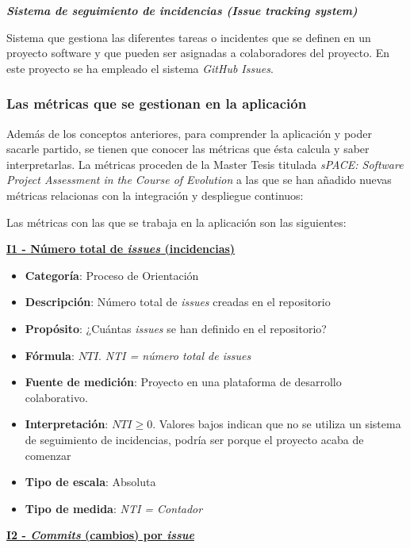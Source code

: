 \textbf{\textit{Sistema de seguimiento de incidencias (\textit{Issue tracking system})}}

Sistema que gestiona las diferentes tareas o incidentes que se definen en un proyecto software y que pueden ser asignadas a colaboradores del proyecto. En este proyecto se ha empleado el sistema \textit{GitHub Issues}.

\subsubsection{Las métricas que se gestionan en la aplicación}

Además de los conceptos anteriores, para comprender la aplicación y poder sacarle partido, se tienen que conocer las métricas que ésta calcula y saber interpretarlas. La métricas proceden de la Master Tesis titulada \textit{sPACE: Software Project Assessment in the Course of Evolution} \cite{ratzinger_space:_2007} a las que se han añadido nuevas métricas relacionas con la integración y despliegue continuos:


Las métricas con las que se trabaja en la aplicación son las siguientes:

\textbf{\underline{I1 - Número total de \textit{issues} (incidencias)}}

\begin{itemize}
	\item \textbf{Categoría}: Proceso de Orientación
	\item \textbf{Descripción}: Número total de \textit{issues} creadas en el repositorio
	\item \textbf{Propósito}: ¿Cuántas \textit{issues} se han definido en el repositorio?
	\item \textbf{Fórmula}: $NTI$. \textit{NTI = número total de \textit{issues}}
	\item \textbf{Fuente de medición}: Proyecto en una plataforma de desarrollo colaborativo.
	\item \textbf{Interpretación}: $NTI \geq 0$. Valores bajos indican que no se utiliza un sistema de seguimiento de incidencias, podría ser porque el proyecto acaba de comenzar
	\item \textbf{Tipo de escala}: Absoluta
	\item \textbf{Tipo de medida}: \textit{NTI = Contador}
\end{itemize}

\textbf{\underline{I2 - \textit{Commits} (cambios) por \textit{issue}}}

